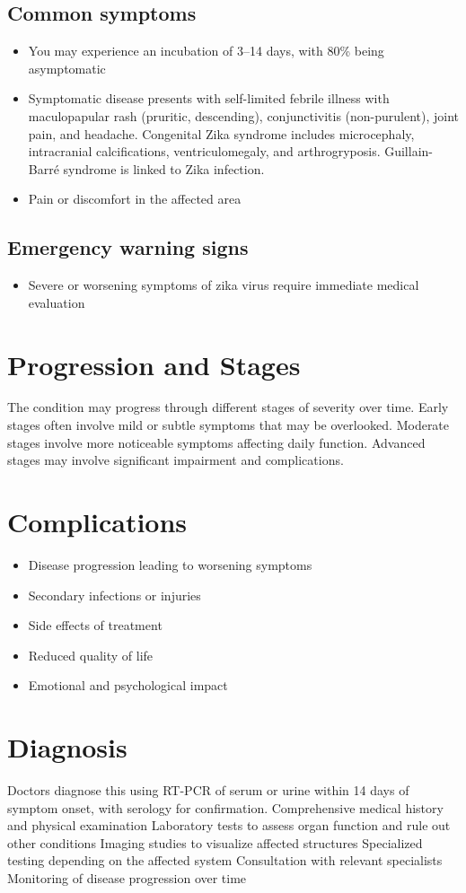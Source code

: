 \subsection{Common symptoms}
\begin{itemize}[noitemsep]
  \item You may experience an incubation of 3--14 days, with 80\% being asymptomatic
  \item Symptomatic disease presents with self-limited febrile illness with maculopapular rash (pruritic, descending), conjunctivitis (non-purulent), joint pain, and headache. Congenital Zika syndrome includes microcephaly, intracranial calcifications, ventriculomegaly, and arthrogryposis. Guillain-Barré syndrome is linked to Zika infection.
  \item Pain or discomfort in the affected area
  \end{itemize}

\subsection{Emergency warning signs}
\begin{itemize}[noitemsep]
  \item Severe or worsening symptoms of zika virus require immediate medical evaluation
\end{itemize}
\section{Progression and Stages}
The condition may progress through different stages of severity over time. Early stages often involve mild or subtle symptoms that may be overlooked. Moderate stages involve more noticeable symptoms affecting daily function. Advanced stages may involve significant impairment and complications.
\section{Complications}
\begin{itemize}[noitemsep]
  \item Disease progression leading to worsening symptoms
  \item Secondary infections or injuries
  \item Side effects of treatment
  \item Reduced quality of life
  \item Emotional and psychological impact
\end{itemize}
\section{Diagnosis}
Doctors diagnose this using RT-PCR of serum or urine within 14 days of symptom onset, with serology for confirmation. Comprehensive medical history and physical examination Laboratory tests to assess organ function and rule out other conditions Imaging studies to visualize affected structures Specialized testing depending on the affected system Consultation with relevant specialists Monitoring of disease progression over time

